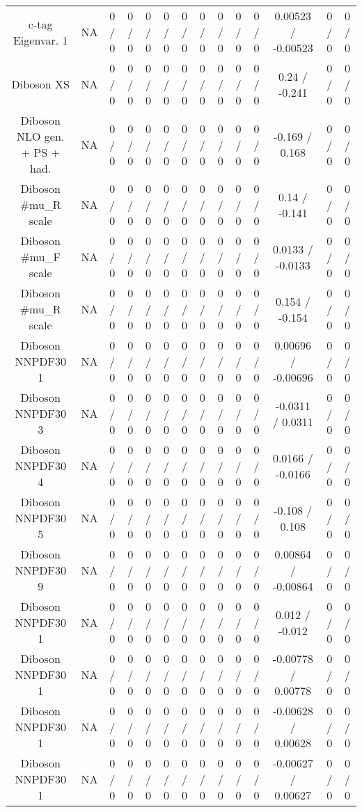 \documentclass[10pt]{article}
\begin{document}
\begin{table}[htbp]
\begin{center}
\begin{tabular}{|c|c|c|c|c|c|c|c|c|c|c|c|c|c|}
  c-tag Eigenvar. 1 &    NA    & 0 / 0 & 0 / 0 & 0 / 0 & 0 / 0 & 0 / 0 & 0 / 0 & 0 / 0 & 0 / 0 & 0 / 0 & 0.00523 / -0.00523 & 0 / 0 & 0 / 0 \\ 
  Diboson XS &    NA    & 0 / 0 & 0 / 0 & 0 / 0 & 0 / 0 & 0 / 0 & 0 / 0 & 0 / 0 & 0 / 0 & 0 / 0 & 0.24 / -0.241 & 0 / 0 & 0 / 0 \\ 
  Diboson NLO gen. + PS + had. &    NA    & 0 / 0 & 0 / 0 & 0 / 0 & 0 / 0 & 0 / 0 & 0 / 0 & 0 / 0 & 0 / 0 & 0 / 0 & -0.169 / 0.168 & 0 / 0 & 0 / 0 \\ 
  Diboson #mu_{R} scale &    NA    & 0 / 0 & 0 / 0 & 0 / 0 & 0 / 0 & 0 / 0 & 0 / 0 & 0 / 0 & 0 / 0 & 0 / 0 & 0.14 / -0.141 & 0 / 0 & 0 / 0 \\ 
  Diboson #mu_{F} scale &    NA    & 0 / 0 & 0 / 0 & 0 / 0 & 0 / 0 & 0 / 0 & 0 / 0 & 0 / 0 & 0 / 0 & 0 / 0 & 0.0133 / -0.0133 & 0 / 0 & 0 / 0 \\ 
  Diboson #mu_{R} scale &    NA    & 0 / 0 & 0 / 0 & 0 / 0 & 0 / 0 & 0 / 0 & 0 / 0 & 0 / 0 & 0 / 0 & 0 / 0 & 0.154 / -0.154 & 0 / 0 & 0 / 0 \\ 
  Diboson NNPDF30 1 &    NA    & 0 / 0 & 0 / 0 & 0 / 0 & 0 / 0 & 0 / 0 & 0 / 0 & 0 / 0 & 0 / 0 & 0 / 0 & 0.00696 / -0.00696 & 0 / 0 & 0 / 0 \\ 
  Diboson NNPDF30 3 &    NA    & 0 / 0 & 0 / 0 & 0 / 0 & 0 / 0 & 0 / 0 & 0 / 0 & 0 / 0 & 0 / 0 & 0 / 0 & -0.0311 / 0.0311 & 0 / 0 & 0 / 0 \\ 
  Diboson NNPDF30 4 &    NA    & 0 / 0 & 0 / 0 & 0 / 0 & 0 / 0 & 0 / 0 & 0 / 0 & 0 / 0 & 0 / 0 & 0 / 0 & 0.0166 / -0.0166 & 0 / 0 & 0 / 0 \\ 
  Diboson NNPDF30 5 &    NA    & 0 / 0 & 0 / 0 & 0 / 0 & 0 / 0 & 0 / 0 & 0 / 0 & 0 / 0 & 0 / 0 & 0 / 0 & -0.108 / 0.108 & 0 / 0 & 0 / 0 \\ 
  Diboson NNPDF30 9 &    NA    & 0 / 0 & 0 / 0 & 0 / 0 & 0 / 0 & 0 / 0 & 0 / 0 & 0 / 0 & 0 / 0 & 0 / 0 & 0.00864 / -0.00864 & 0 / 0 & 0 / 0 \\ 
  Diboson NNPDF30 1 &    NA    & 0 / 0 & 0 / 0 & 0 / 0 & 0 / 0 & 0 / 0 & 0 / 0 & 0 / 0 & 0 / 0 & 0 / 0 & 0.012 / -0.012 & 0 / 0 & 0 / 0 \\ 
  Diboson NNPDF30 1 &    NA    & 0 / 0 & 0 / 0 & 0 / 0 & 0 / 0 & 0 / 0 & 0 / 0 & 0 / 0 & 0 / 0 & 0 / 0 & -0.00778 / 0.00778 & 0 / 0 & 0 / 0 \\ 
  Diboson NNPDF30 1 &    NA    & 0 / 0 & 0 / 0 & 0 / 0 & 0 / 0 & 0 / 0 & 0 / 0 & 0 / 0 & 0 / 0 & 0 / 0 & -0.00628 / 0.00628 & 0 / 0 & 0 / 0 \\ 
  Diboson NNPDF30 1 &    NA    & 0 / 0 & 0 / 0 & 0 / 0 & 0 / 0 & 0 / 0 & 0 / 0 & 0 / 0 & 0 / 0 & 0 / 0 & -0.00627 / 0.00627 & 0 / 0 & 0 / 0 \\ 

\end{tabular}
\end{center}
\end{table}
\end{document}
